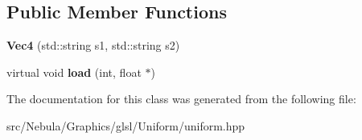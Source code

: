 \subsection*{\-Public \-Member \-Functions}
\begin{DoxyCompactItemize}
\item 
\hypertarget{classNeb_1_1glsl_1_1Uniform_1_1Vector_1_1Vec4_a507acc5ac257f999383cfa4a8622a34c}{{\bfseries \-Vec4} (std\-::string s1, std\-::string s2)}\label{classNeb_1_1glsl_1_1Uniform_1_1Vector_1_1Vec4_a507acc5ac257f999383cfa4a8622a34c}

\item 
\hypertarget{classNeb_1_1glsl_1_1Uniform_1_1Vector_1_1Vec4_a64b45fde2902645ba378170dcfe0fda8}{virtual void {\bfseries load} (int, float $\ast$)}\label{classNeb_1_1glsl_1_1Uniform_1_1Vector_1_1Vec4_a64b45fde2902645ba378170dcfe0fda8}

\end{DoxyCompactItemize}


\-The documentation for this class was generated from the following file\-:\begin{DoxyCompactItemize}
\item 
src/\-Nebula/\-Graphics/glsl/\-Uniform/uniform.\-hpp\end{DoxyCompactItemize}
